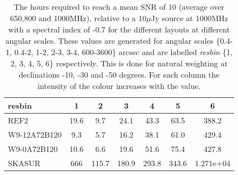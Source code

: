 \begin{table}[!htp]
{{\begin{tabular}{|lcccccc|}
 resbin & 1 & 2 & 3 & 4 & 5 & 6\tabularnewline \hline
REF2 & 19.6 \cellcolor{blue!18.66} & 9.7 \cellcolor{red!19.52} & 24.1 \cellcolor{green!20.02} & 43.3 \cellcolor{orange!18.86} & 63.5 \cellcolor{purple!18.37} & 388.2 \cellcolor{blue!18.00}\\ \hline 
W9-12A72B120 & 9.3 \cellcolor{blue!18.00} & 5.7 \cellcolor{red!18.00} & 16.2 \cellcolor{green!18.00} & 38.1 \cellcolor{orange!18.00} & 61.0 \cellcolor{purple!18.00} & 429.4 \cellcolor{blue!18.14}\\ \hline 
W9-0A72B120 & 10.6 \cellcolor{blue!18.08} & 6.6 \cellcolor{red!18.35} & 19.6 \cellcolor{green!18.87} & 51.6 \cellcolor{orange!20.23} & 75.4 \cellcolor{purple!20.14} & 427.8 \cellcolor{blue!18.13}\\ \hline 
SKASUR & 666 \cellcolor{blue!60.00} & 115.7 \cellcolor{red!60.00} & 180.9 \cellcolor{green!60.00} & 293.8 \cellcolor{orange!60.00} & 343.6 \cellcolor{purple!60.00} & 1.271e+04 \cellcolor{blue!60.00}\tabularnewline \hline 
\end{tabular}}\hfill \\

\caption{The hours required to reach a mean SNR of 10 (average over 650,800 and 1000MHz), relative to a 10$\mu$Jy source at 1000MHz with a spectral index of -0.7 for the different layouts at different angular scales. These values are generated for angular scales \{0.4-1, 0.4-2, 1-2, 2-3, 3-4, 600-3600\} arcsec and are labelled {\it resbin} \{1, 2, 3, 4, 5, 6\} respectively. This is done for natural weighting at declinations -10, -30 and -50 degrees. For each column the intensity of the colour increases with the value.}\label{tab:hours-band1}}
 \end{table}